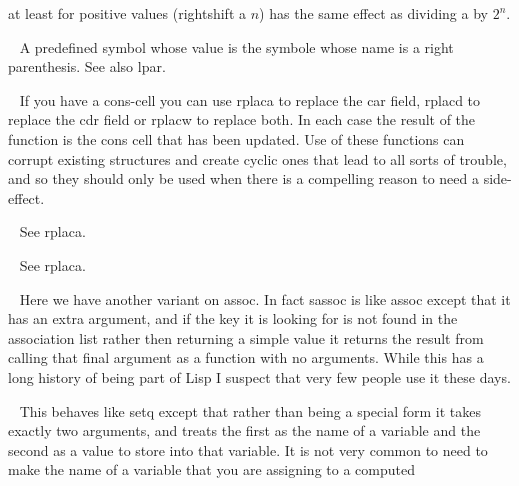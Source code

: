 \begin{description}
at least for positive values {\tx (rightshift a $n$)} has the same
effect as dividing {\tx a} by $2^{n}$.
\item[{\tx rpar~~~~~~~~~} \hspace{1cm} {\em predefined variable}]~\newline
A predefined symbol whose value is the symbole whose name is a right
parenthesis. See also {\tx lpar}.
\item[{\tx rplaca~~~~~~~} \hspace{1cm} {\em function 2 args}]~\newline
If you have a {\tx cons}-cell you can use {\tx rplaca} to replace the
{\tx car} field, {\tx rplacd} to replace the {\tx cdr} field or
{\tx rplacw} to replace both. In each case the result of the function is the
{\tx cons} cell that has been updated. Use of these functions can corrupt
existing structures and create cyclic ones that lead to all sorts of trouble,
and so they should only be used when there is a compelling reason to need
a side-effect.
\item[{\tx rplacd~~~~~~~} \hspace{1cm} {\em function 2 args}]~\newline
See {\tx rplaca}.
\item[{\tx rplacw~~~~~~~} \hspace{1cm} {\em function 2 args}]~\newline
See {\tx rplaca}.
\item[{\tx sassoc~~~~~~~} \hspace{1cm} {\em function 3 args}]~\newline
Here we have another variant on {\tx assoc}. In fact {\tx sassoc} is like
{\tx assoc} except that it has an extra argument, and if the key it is looking
for is not found in the association list rather then returning a simple value
\nil{} it returns the result from calling that final argument as a function
with no arguments. While this has a long history of being part of Lisp
I suspect that very few people use it these days.
\item[{\tx set~~~~~~~~~~} \hspace{1cm} {\em function 2 args}]~\newline
This behaves like {\tx setq} except that rather than being a special form it
takes exactly two arguments, and treats the first as the name of a variable
and the second as a value to store into that variable. It is not very common
to need to make the name of a variable that you are assigning to a computed

\end{description}

